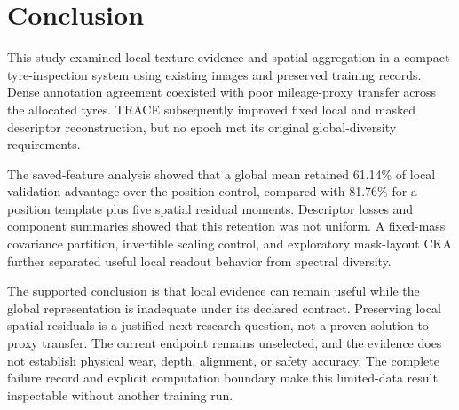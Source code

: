 \section{Conclusion}\label{sec:conclusion}
This study examined local texture evidence and spatial aggregation in a compact tyre-inspection system using existing images and preserved training records. Dense annotation agreement coexisted with poor mileage-proxy transfer across the allocated tyres. TRACE subsequently improved fixed local and masked descriptor reconstruction, but no epoch met its original global-diversity requirements.\AIdraftingnote

The saved-feature analysis showed that a global mean retained 61.14\% of local validation advantage over the position control, compared with 81.76\% for a position template plus five spatial residual moments. Descriptor losses and component summaries showed that this retention was not uniform. A fixed-mass covariance partition, invertible scaling control, and exploratory mask-layout CKA further separated useful local readout behavior from spectral diversity.

The supported conclusion is that local evidence can remain useful while the global representation is inadequate under its declared contract. Preserving local spatial residuals is a justified next research question, not a proven solution to proxy transfer. The current endpoint remains unselected, and the evidence does not establish physical wear, depth, alignment, or safety accuracy. The complete failure record and explicit computation boundary make this limited-data result inspectable without another training run.
